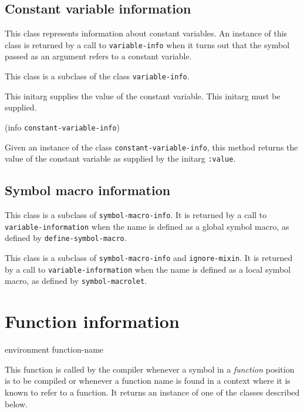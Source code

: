 \subsection{Constant variable information}


This class represents information about constant variables.   An
instance of this class is returned by a call to \texttt{variable-info}
when it turns out that the symbol passed as an argument refers to a
constant variable.

This class is a subclass of the class \texttt{variable-info}.


This initarg supplies the value of the constant variable.  This
initarg must be supplied.

 {(info {\tt constant-variable-info})}

Given an instance of the class \texttt{constant-variable-info}, this
method returns the value of the constant variable as supplied by the
initarg \texttt{:value}.

\subsection{Symbol macro information}


This class is a subclass of \texttt{symbol-macro-info}.  It is
returned by a call to \texttt{variable-information} when the name is
defined as a global symbol macro, as defined by
\texttt{define-symbol-macro}.


This class is a subclass of \texttt{symbol-macro-info} and
\texttt{ignore-mixin}.  It is returned by a call to
\texttt{variable-information} when the name is defined as a local
symbol macro, as defined by \texttt{symbol-macrolet}.

\section{Function information}

 {environment function-name}

This function is called by the compiler whenever a symbol in a
\emph{function} position is to be compiled or whenever a function name
is found in a context where it is known to refer to a function.  It
returns an instance of one of the classes described below.

